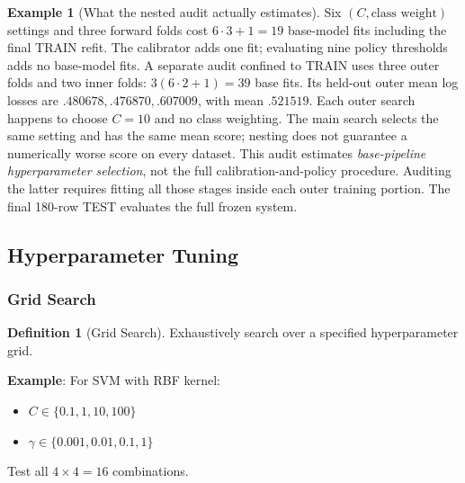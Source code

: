 \documentclass[11pt,twoside]{article}
\numberwithin{equation}{section}
\theoremstyle{plain}
\theoremstyle{definition}
\newtheorem{definition}[theorem]{Definition}
\newtheorem{example}[theorem]{Example}
\theoremstyle{remark}
\begin{document}
\begin{example}[What the nested audit actually estimates]
Six $(C,\text{class weight})$ settings and three forward folds cost
$6\cdot3+1=19$ base-model fits including the final TRAIN refit. The calibrator
adds one fit; evaluating nine policy thresholds adds no base-model fits.
A separate audit confined to TRAIN uses three outer folds and two inner
folds: $3(6\cdot2+1)=39$ base fits. Its held-out outer mean log losses are
$.480678,.476870,.607009$, with mean $.521519$. Each outer search happens
to choose $C=10$ and no class weighting. The main search selects the same
setting and has the same mean score; nesting does not guarantee a numerically
worse score on every dataset. This audit estimates \emph{base-pipeline
hyperparameter selection}, not the full calibration-and-policy procedure.
Auditing the latter requires fitting all those stages inside each outer
training portion. The final 180-row TEST evaluates the full frozen system.
\end{example}

\subsection{Hyperparameter Tuning}

\subsubsection{Grid Search}

\begin{definition}[Grid Search]
Exhaustively search over a specified hyperparameter grid.

\textbf{Example}: For SVM with RBF kernel:
\begin{itemize}
\item $C \in \{0.1, 1, 10, 100\}$
\item $\gamma \in \{0.001, 0.01, 0.1, 1\}$
\end{itemize}
Test all $4 \times 4 = 16$ combinations.
\end{definition}
\end{document}
